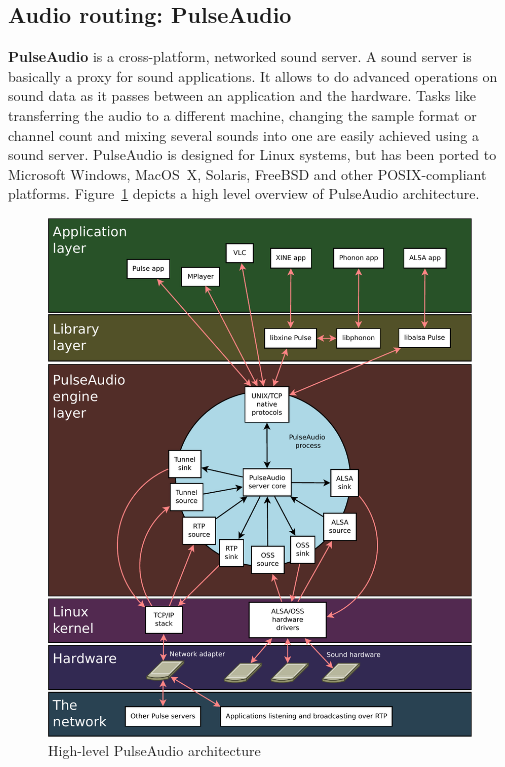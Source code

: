 \documentclass{IEEEtran}
\begin{document}
\subsection{Audio routing: PulseAudio}
\textbf{PulseAudio} is a cross-platform, networked sound server. A sound server is basically a proxy for sound applications. It allows to do advanced operations on sound data as it passes between an application and the hardware. Tasks like transferring the audio to a different machine, changing the sample format or channel count and mixing several sounds into one are easily achieved using a sound server. PulseAudio is designed for Linux systems, but has been ported to Microsoft Windows, MacOS~X, Solaris, FreeBSD and other POSIX-compliant platforms. Figure~\ref{pa} depicts a high level overview of PulseAudio architecture.

\begin{figure}
\centering
\includegraphics[width=\columnwidth]{PulseAudio}
\caption{High-level PulseAudio architecture}
\label{pa}
\end{figure}
\end{document}
